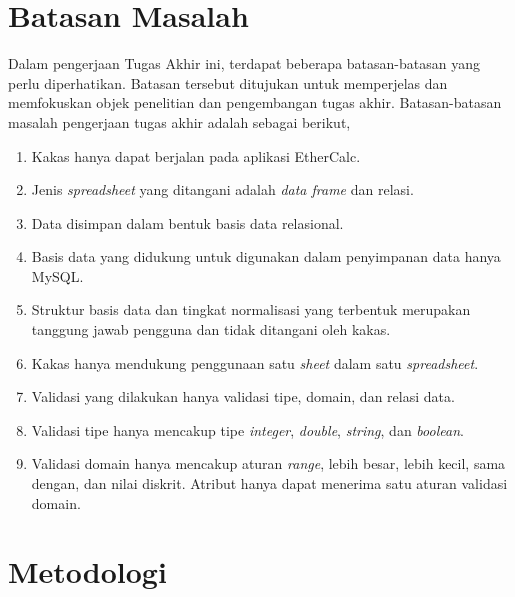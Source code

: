\section{Batasan Masalah}

Dalam pengerjaan Tugas Akhir ini, terdapat beberapa batasan-batasan yang perlu diperhatikan. Batasan tersebut ditujukan untuk memperjelas dan memfokuskan objek penelitian dan pengembangan tugas akhir. Batasan-batasan masalah pengerjaan tugas akhir adalah sebagai berikut,

\begin{enumerate}
    \item Kakas hanya dapat berjalan pada aplikasi EtherCalc.
    \item Jenis \textit{spreadsheet} yang ditangani adalah \textit{data frame} dan relasi.
    \item Data disimpan dalam bentuk basis data relasional.
    \item Basis data yang didukung untuk digunakan dalam penyimpanan data hanya MySQL.
    \item Struktur basis data dan tingkat normalisasi yang terbentuk merupakan tanggung jawab pengguna dan tidak ditangani oleh kakas.
    \item Kakas hanya mendukung penggunaan satu \textit{sheet} dalam satu \textit{spreadsheet}.
    \item Validasi yang dilakukan hanya validasi tipe, domain, dan relasi data.
    \item Validasi tipe hanya mencakup tipe \textit{integer}, \textit{double}, \textit{string}, dan \textit{boolean}.
    \item Validasi domain hanya mencakup aturan \textit{range}, lebih besar, lebih kecil, sama dengan, dan nilai diskrit. Atribut hanya dapat menerima satu aturan validasi domain.
\end{enumerate}

\section{Metodologi}

